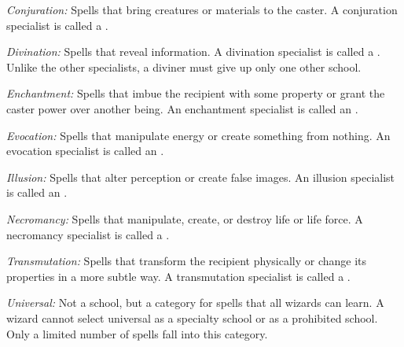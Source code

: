 \textit{Conjuration:} Spells that bring creatures or materials to the caster. A conjuration specialist is called a .

\textit{Divination:} Spells that reveal information. A divination specialist is called a . Unlike the other specialists, a diviner must give up only one other school.

\textit{Enchantment:} Spells that imbue the recipient with some property or grant the caster power over another being. An enchantment specialist is called an .

\textit{Evocation:} Spells that manipulate energy or create something from nothing. An evocation specialist is called an .

\textit{Illusion:} Spells that alter perception or create false images. An illusion specialist is called an .

\textit{Necromancy:} Spells that manipulate, create, or destroy life or life force. A necromancy specialist is called a .

\textit{Transmutation:} Spells that transform the recipient physically or change its properties in a more subtle way. A transmutation specialist is called a .

\textit{Universal:} Not a school, but a category for spells that all wizards can learn. A wizard cannot select universal as a specialty school or as a prohibited school. Only a limited number of spells fall into this category.
